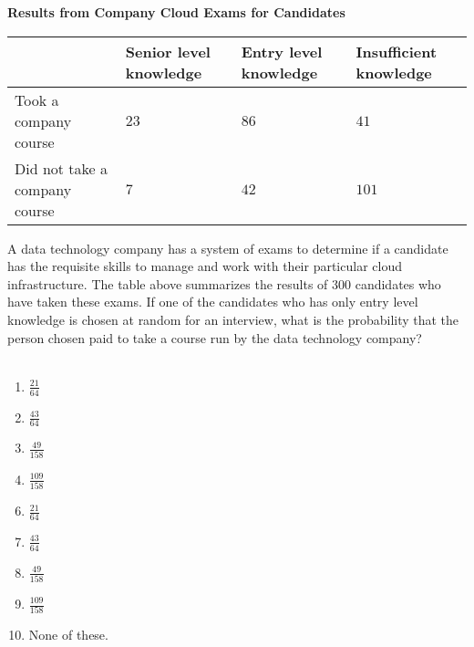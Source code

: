   
\begin{center}
\textbf{Results from Company Cloud Exams for Candidates}\vspace{2mm}\\
\begin{tabular}{p{2.2cm}|p{1.6cm}|p{1.6cm}|p{1.6cm}|}\cline{2-4}
&Senior level knowledge & Entry level knowledge & Insufficient knowledge\\\hline
\multicolumn{1}{|p{2.4cm}|}{Took a company course} 
& \begin{center}$23$\end{center} 
& \begin{center}$86$\end{center} 
& \begin{center}$41$\end{center} \\ \hline
\multicolumn{1}{|p{2.4cm}|}{Did not take a company course}
& \begin{center}$7$\end{center} 
& \begin{center}$42$\end{center} 
& \begin{center}$101$\end{center} \\ \hline
\end{tabular}
\end{center}
A data technology company has a system of exams to determine if a candidate has the requisite skills to manage and work with their particular cloud infrastructure.  The table above summarizes the results of $300$ candidates who have taken these exams.  If one of the candidates who has only entry level knowledge is chosen at random for an interview, what is the probability that the person chosen paid to take a course run by the data technology company?\\ \\


\ifsat
	\begin{enumerate}[label=\Alph*)]
		\item $\frac{21}{64} $ 
		\item $\frac{43}{64} $ %
		\item $\frac{49}{158} $ 
		\item $\frac{109}{158} $
	\end{enumerate}
\else
\fi

\ifacteven
	\begin{enumerate}[label=\textbf{\Alph*.},itemsep=\fill,align=left]
		\setcounter{enumii}{5}
		\item $\frac{21}{64} $ 
		\item $\frac{43}{64} $ %
		\item $\frac{49}{158} $ 
		\addtocounter{enumii}{1}
		\item $\frac{109}{158} $
		\item None of these. 
	\end{enumerate}
\else
\fi


